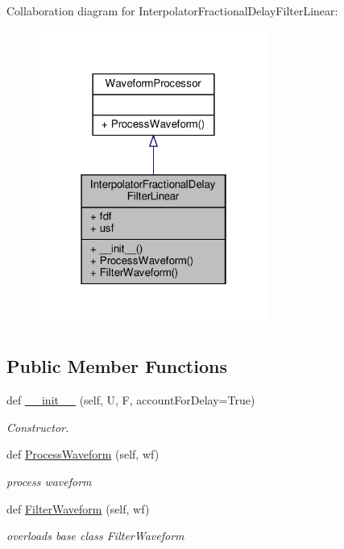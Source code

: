 Collaboration diagram for Interpolator\+Fractional\+Delay\+Filter\+Linear\+:\nopagebreak
\begin{figure}[H]
\begin{center}
\leavevmode
\includegraphics[width=214pt]{classSignalIntegrity_1_1TimeDomain_1_1Filters_1_1InterpolatorLinear_1_1InterpolatorFractionalDelayFilterLinear__coll__graph}
\end{center}
\end{figure}
\subsection*{Public Member Functions}
\begin{DoxyCompactItemize}
\item 
def \hyperlink{classSignalIntegrity_1_1TimeDomain_1_1Filters_1_1InterpolatorLinear_1_1InterpolatorFractionalDelayFilterLinear_a81150f52975e0ef244e215c5faf0291e}{\+\_\+\+\_\+init\+\_\+\+\_\+} (self, U, F, account\+For\+Delay=True)
\begin{DoxyCompactList}\small\item\em Constructor. \end{DoxyCompactList}\item 
def \hyperlink{classSignalIntegrity_1_1TimeDomain_1_1Filters_1_1InterpolatorLinear_1_1InterpolatorFractionalDelayFilterLinear_ae09bec195c9cb1d5819e73b7be169b11}{Process\+Waveform} (self, wf)
\begin{DoxyCompactList}\small\item\em process waveform \end{DoxyCompactList}\item 
def \hyperlink{classSignalIntegrity_1_1TimeDomain_1_1Filters_1_1InterpolatorLinear_1_1InterpolatorFractionalDelayFilterLinear_a84e73c18250ca4a61482f94ad61e735b}{Filter\+Waveform} (self, wf)
\begin{DoxyCompactList}\small\item\em overloads base class Filter\+Waveform \end{DoxyCompactList}\end{DoxyCompactItemize}


